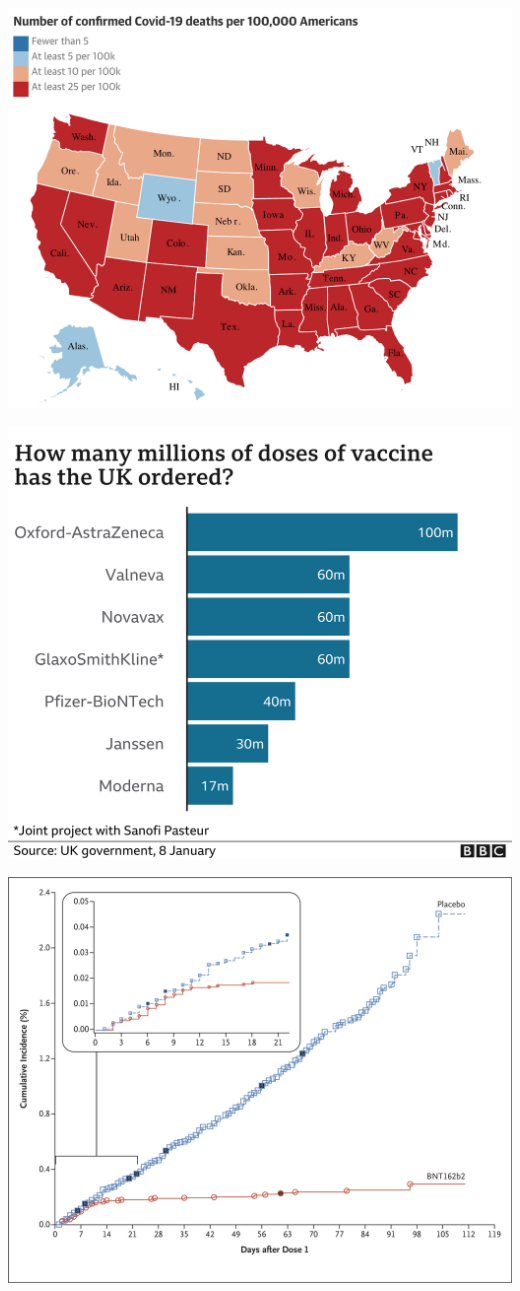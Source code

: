 \documentclass[
]{book}
\begin{document}
\includegraphics{img/visb.png}

\includegraphics{img/visc.png}

\includegraphics{img/visd.png}
\end{document}
